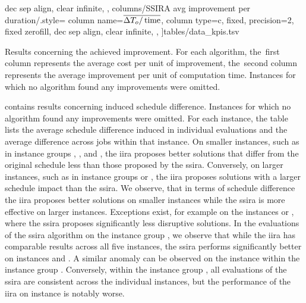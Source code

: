 \begin{table}[p]
{            dec sep align,
            clear infinite,
            },
        columns/SSIRA avg improvement per duration/.style={
            column name=$\overline{\Delta T_{o} / \operatorname{time}}$,
            column type=c,
            fixed, precision=2,
            fixed zerofill,
            dec sep align,
            clear infinite,
            },
    ]{tables/data_kpis.tsv}
    \caption{
        Results concerning the achieved improvement.
        For each algorithm, the~first column represents the average cost per unit of improvement,
        the~second column represents the average improvement per unit of computation time.
        Instances for which no algorithm found any improvements were omitted.
        }
    \label{tab:exp/kpis-improvements}
\end{table}



 contains results concerning induced schedule difference.
Instances for which no algorithm found any improvements were omitted.
For each instance, the table lists
the average schedule difference induced in individual evaluations
and the average difference across jobs within that instance.
On smaller instances, such as in instance groups , , and ,
the \ac{iira} proposes better solutions that differ from the original schedule
less than those proposed by the \ac{ssira}.
Conversely, on larger instances, such as in instance groups  or ,
the \ac{iira} proposes solutions with a larger schedule impact than the \ac{ssira}.
We observe, that in terms of schedule difference
the \ac{iira} proposes better solutions on smaller instances while
the \ac{ssira} is more effective on larger instances.
Exceptions exist, for example on the instances  or ,
where the \ac{ssira} proposes significantly less disruptive solutions.
In the evaluations of the \ac{ssira} algorithm on the instance group ,
we observe that while the \ac{iira} has comparable results across all five instances,
the \ac{ssira} performs significantly better on instances  and .
A similar anomaly can be observed on the instance  within the instance group .
Conversely, within the instance group ,
all evaluations of the \ac{ssira} are consistent across the individual instances,
but the performance of the \ac{iira} on instance  is notably worse.

